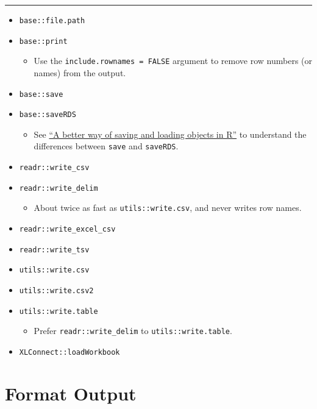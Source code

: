 \documentclass[
]{book}
\providecommand{\tightlist}{%
  \setlength{\itemsep}{0pt}\setlength{\parskip}{0pt}}
\begin{document}
\begin{center}\rule{0.5\linewidth}{0.5pt}\end{center}

\begin{itemize}
\tightlist
\item
  \texttt{base::file.path}
\item
  \texttt{base::print}

  \begin{itemize}
  \tightlist
  \item
    Use the \texttt{include.rownames\ =\ FALSE} argument to remove row numbers (or names) from the output.
  \end{itemize}
\item
  \texttt{base::save}
\item
  \texttt{base::saveRDS}

  \begin{itemize}
  \tightlist
  \item
    See \href{https://www.fromthebottomoftheheap.net/2012/04/01/saving-and-loading-r-objects/}{``A better way of saving and loading objects in R''} to understand the differences between \texttt{save} and \texttt{saveRDS}.
  \end{itemize}
\item
  \texttt{readr::write\_csv}
\item
  \texttt{readr::write\_delim}

  \begin{itemize}
  \tightlist
  \item
    About twice as fast as \texttt{utils::write.csv}, and never writes row names.
  \end{itemize}
\item
  \texttt{readr::write\_excel\_csv}
\item
  \texttt{readr::write\_tsv}
\item
  \texttt{utils::write.csv}
\item
  \texttt{utils::write.csv2}
\item
  \texttt{utils::write.table}

  \begin{itemize}
  \tightlist
  \item
    Prefer \texttt{readr::write\_delim} to \texttt{utils::write.table}.
  \end{itemize}
\item
  \texttt{XLConnect::loadWorkbook}
\end{itemize}

\hypertarget{format-output}{%
\section{Format Output}\label{format-output}}
\end{document}
